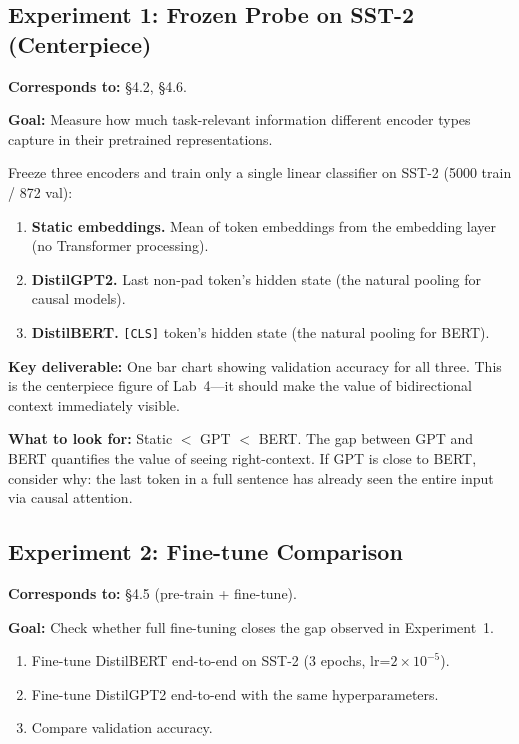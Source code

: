 \subsection*{Experiment 1: Frozen Probe on SST-2 (Centerpiece)}

\textbf{Corresponds to:} \S4.2, \S4.6.

\textbf{Goal:} Measure how much task-relevant information different encoder types capture in their pretrained representations.

Freeze three encoders and train only a single linear classifier on SST-2 (5000 train / 872 val):

\begin{enumerate}[nosep]
    \item \textbf{Static embeddings.} Mean of token embeddings from the embedding layer (no Transformer processing).
    \item \textbf{DistilGPT2.} Last non-pad token's hidden state (the natural pooling for causal models).
    \item \textbf{DistilBERT.} \texttt{[CLS]} token's hidden state (the natural pooling for BERT).
\end{enumerate}

\textbf{Key deliverable:} One bar chart showing validation accuracy for all three. This is the centerpiece figure of Lab~4---it should make the value of bidirectional context immediately visible.

\textbf{What to look for:} Static $<$ GPT $<$ BERT. The gap between GPT and BERT quantifies the value of seeing right-context. If GPT is close to BERT, consider why: the last token in a full sentence has already seen the entire input via causal attention.

\subsection*{Experiment 2: Fine-tune Comparison}

\textbf{Corresponds to:} \S4.5 (pre-train + fine-tune).

\textbf{Goal:} Check whether full fine-tuning closes the gap observed in Experiment~1.

\begin{enumerate}[nosep]
    \item Fine-tune DistilBERT end-to-end on SST-2 (3 epochs, lr=$2 \times 10^{-5}$).
    \item Fine-tune DistilGPT2 end-to-end with the same hyperparameters.
    \item Compare validation accuracy.
\end{enumerate}

